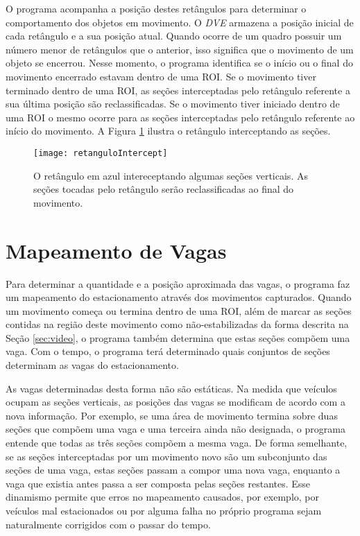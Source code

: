 O programa acompanha a posição destes retângulos para determinar o comportamento dos objetos em movimento. O \textit{DVE} armazena a posição inicial de cada retângulo e a sua posição atual. Quando ocorre de um quadro possuir um número menor de retângulos que o anterior, isso significa que o movimento de um objeto se encerrou. Nesse momento, o programa identifica se o início ou o final do movimento encerrado estavam dentro de uma ROI. Se o movimento tiver terminado dentro de uma ROI, as seções interceptadas pelo retângulo referente a sua última posição são reclassificadas. Se o movimento tiver iniciado dentro de uma ROI o mesmo ocorre para as seções interceptadas pelo retângulo referente ao início do movimento. A Figura \ref{fig:movimentoIntercept} ilustra o retângulo interceptando as seções.

\begin{figure}
\centering
\texttt{[image: retanguloIntercept]}
\centering
\caption{O retângulo em azul intereceptando algumas seções verticais. As seções tocadas pelo retângulo serão reclassificadas ao final do movimento.}
\label{fig:movimentoIntercept}
\end{figure}


\section{Mapeamento de Vagas}

Para determinar a quantidade e a posição aproximada das vagas, o programa faz um mapeamento do estacionamento através dos movimentos capturados. Quando um movimento começa ou termina dentro de uma ROI, além de marcar as seções contidas na região deste movimento como não-estabilizadas da forma descrita na Seção \ref{sec:video}, o programa também determina que estas seções compõem uma vaga. Com o tempo, o programa terá determinado quais conjuntos de seções determinam as vagas do estacionamento.

As vagas determinadas desta forma não são estáticas. Na medida que veículos ocupam as seções verticais, as posições das vagas se modificam de acordo com a nova informação. Por exemplo, se uma área de movimento termina sobre duas seções que compõem uma vaga e uma terceira ainda não designada, o programa entende que todas as três seções compõem a mesma vaga. De forma semelhante, se as seções interceptadas por um movimento novo são um subconjunto das seções de uma vaga, estas seções passam a compor uma nova vaga, enquanto a vaga que existia antes passa a ser composta pelas seções restantes. Esse dinamismo permite que erros no mapeamento causados, por exemplo, por veículos mal estacionados ou por alguma falha no próprio programa sejam naturalmente corrigidos com o passar do tempo.

